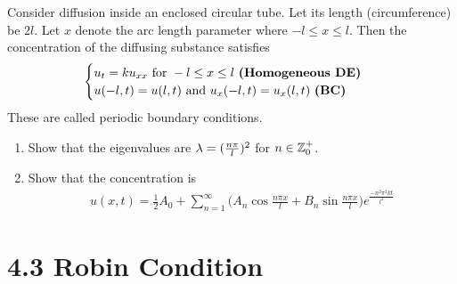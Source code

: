 \documentclass{report}
\begin{document}
\begin{question}{}{}
Consider diffusion inside an enclosed circular tube. Let its length (circumference) be $2l$. Let  $x$ denote the arc length parameter where  $-l\leq x\leq l$. Then the concentration of the diffusing substance satisfies 
\begin{align*}
\begin{cases}
  u_t=ku_{xx}\text{ for }-l \leq x\leq l \text{ \textbf{(Homogeneous DE)} }\\
  u(-l,t)=u(l,t)\text{ and }u_x(-l,t)=u_x(l,t)\text{ \textbf{(BC)} } 
\end{cases}
\end{align*}
These are called periodic boundary conditions. 
\begin{enumerate}[label=(\alph*)]
  \item Show that the eigenvalues are $\lambda = (\frac{n \pi}{l})^2$ for $n\in\mathbb{Z}_0^+$.
  \item Show that the concentration is 
    \begin{align*}
    u(x,t)= \frac{1}{2}A_0+ \sum_{n=1}^{\infty}\Big(A_n \cos \frac{n \pi x}{l}+ B_n \sin \frac{n \pi x}{l} \Big)e^{\frac{-n^2\pi ^2 kt}{l^2}}
    \end{align*}
\end{enumerate}
\end{question}
\section{4.3 Robin Condition}
\end{document}
